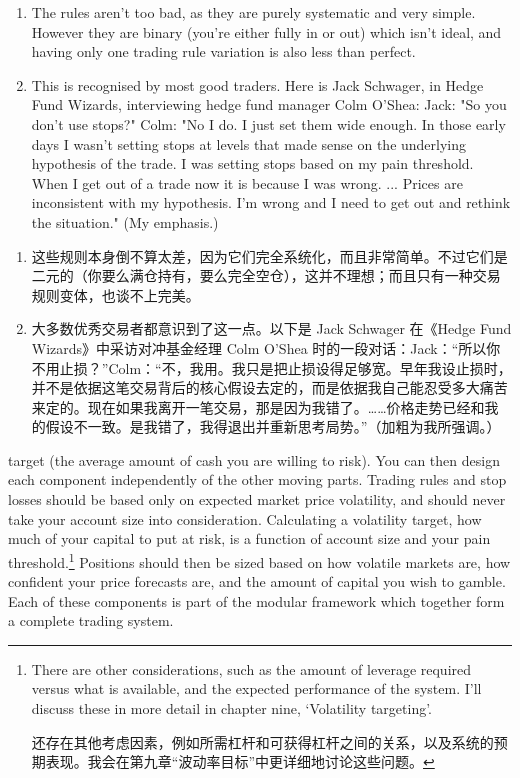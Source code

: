 \begin{enumerate}
\item The rules aren't too bad, as they are purely systematic and very simple. However they are binary (you're either fully in or out) which isn't ideal, and having only one trading rule variation is also less than perfect.
\item This is recognised by most good traders. Here is Jack Schwager, in Hedge Fund Wizards, interviewing hedge fund manager Colm O'Shea: Jack: "So you don't use stops?" Colm: "No I do. I just set them wide enough. In those early days I wasn't setting stops at levels that made sense on the underlying hypothesis of the trade. I was setting stops based on my pain threshold. When I get out of a trade now it is because I was wrong. ... Prices are inconsistent with my hypothesis. I'm wrong and I need to get out and rethink the situation." (My emphasis.) \end{enumerate}

\begin{enumerate}
\item 这些规则本身倒不算太差，因为它们完全系统化，而且非常简单。不过它们是二元的（你要么满仓持有，要么完全空仓），这并不理想；而且只有一种交易规则变体，也谈不上完美。
\item 大多数优秀交易者都意识到了这一点。以下是 Jack Schwager 在《Hedge Fund Wizards》中采访对冲基金经理 Colm O'Shea 时的一段对话：Jack：“所以你不用止损？”Colm：“不，我用。我只是把止损设得足够宽。早年我设止损时，并不是依据这笔交易背后的核心假设去定的，而是依据我自己能忍受多大痛苦来定的。现在如果我离开一笔交易，那是因为我错了。……价格走势已经和我的假设不一致。是我错了，我得退出并重新思考局势。”（加粗为我所强调。）\end{enumerate}

\begin{englishblock} target (the average amount of cash you are willing to risk). You can then design each component independently of the other moving parts. Trading rules and stop losses should be based only on expected market price volatility, and should never take your account size into consideration. Calculating a volatility target, how much of your capital to put at risk, is a function of account size and your pain threshold.\footnote{There are other considerations, such as the amount of leverage required versus what is available, and the expected performance of the system. I'll discuss these in more detail in chapter nine, ‘Volatility targeting'. \par 还存在其他考虑因素，例如所需杠杆和可获得杠杆之间的关系，以及系统的预期表现。我会在第九章“波动率目标”中更详细地讨论这些问题。} Positions should then be sized based on how volatile markets are, how confident your price forecasts are, and the amount of capital you wish to gamble. Each of these components is part of the modular framework which together form a complete trading system. \end{englishblock}

